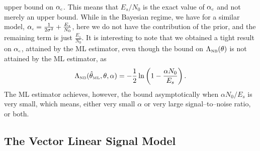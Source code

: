 \documentclass[11pt,epsf]{article}
\newcommand{\ct}{\hat{\theta}}
\begin{document}
upper bound on $\alpha_{\mbox{\tiny c}}$. This means that
$E_s/N_0$ is the exact value of $\alpha_{\mbox{\tiny c}}$ and not merely an
upper bound. While in the Bayesian regime, we have for a similar model,
$\alpha_{\mbox{\tiny c}}=\frac{1}{2\sigma^2}+\frac{E_s}{N_0}$, here we do not
have the contribution of the prior, and the remaining term is just
$\frac{E_s}{N_0}$. It is interesting to note that we obtained a tight result
on $\alpha_{\mbox{\tiny c}}$, attained by the ML estimator, even though the bound
on $\Lambda_{\mbox{\tiny NB}}(\theta)$ is not attained by the ML estimator, as
\begin{equation}
\Lambda_{\mbox{\tiny NB}}(\ct_{\mbox{\tiny ML}},\theta,\alpha)
=-\frac{1}{2}\ln\left(1-\frac{\alpha
N_0}{E_s}\right).
\end{equation}
The ML estimator achieves, however, the bound
asymptotically when $\alpha N_0/E_s$ is very small, which means, either very
small $\alpha$ or very large signal--to--noise ratio, or both.

\subsection{The Vector Linear Signal Model}
\end{document}
